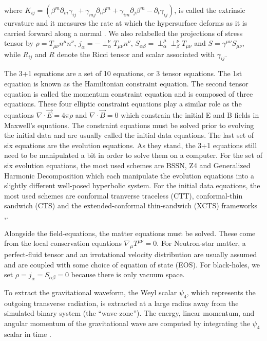 \documentclass{ut-thesis}
\begin{document}
where $K_{ij} = (\beta^m\partial_m\gamma_{ij} + \gamma_{mj}\partial_{i}\beta^{m} + \gamma_{im}\partial_j\beta^{m}-\partial_{t}\gamma_{ij})$, is called the extrinsic curvature and it measures
the rate at which the hypersurface deforms as it is carried forward along a normal \cite{baumgarte2010numerical}. We also relabelled the projections of stress tensor by $\rho = T_{\mu\nu} n^{\mu} n^{\nu}$, $j_{\alpha}= -\perp^{\nu}_{\alpha} T_{\mu\nu} n^{\nu}$, $S_{\alpha\beta} = \perp^{\mu}_{\alpha} \perp^{\nu}_{\beta} T_{\mu\nu}$ and $S=\gamma^{\mu\nu} S_{\mu\nu}$, while $R_{ij}$ and $R$ denote the Ricci tensor and scalar associated with $\gamma_{ij}$.

The 3+1 equations are a set of 10 equations, or 3 tensor equations. The 1st equation is known as the Hamiltonian constraint equation. The second tensor equation is called the momentum constraint equation and is composed of three equations. These four elliptic constraint equations play a similar role as the equations $\nabla \cdot \vec E = 4\pi\rho$ and $\nabla \cdot \vec B = 0$ which constrain the initial E and B fields in Maxwell's equations. The constraint equations must be solved prior to evolving the initial data and are usually called the initial data equations. The last set of six equations are the evolution equations. As they stand, the 3+1 equations still need to be manipulated a bit in order to solve them on a computer. For the set of six evolution equations, the most used schemes are BSSN, Z4 and Generalized Harmonic Decomposition which each manipulate the evolution equations into a slightly different well-posed hyperbolic system. For the initial data equations, the most used schemes are conformal tranverse traceless (CTT), conformal-thin sandwich (CTS) and the extended-conformal thin-sandwich (XCTS) frameworks \cite{alcubierre2012introduction},\cite{sopuerta2015gravitational}.

Alongside the field-equations, the matter equations must be solved. These come from the local conservation equations $\nabla_{\mu}T^{\mu\nu} = 0$. For Neutron-star matter, a perfect-fluid tensor and an irrotational velocity distribution are usually assumed and are coupled with some choice of equation of state (EOS). For black-holes, we set $\rho = j_{\alpha} = S_{\alpha\beta} = 0$ because there is only vacuum space.

To extract the gravitational waveform, the Weyl scalar $\psi_{4}$, which represents the outgoing transverse radiation, is extracted at a large radius away from the simulated binary system (the ``wave-zone''). The energy, linear momentum, and angular momentum of the gravitational wave are computed by integrating the $\psi_{4}$ scalar in time \cite{kyutoku2015dynamical}.
\end{document}

